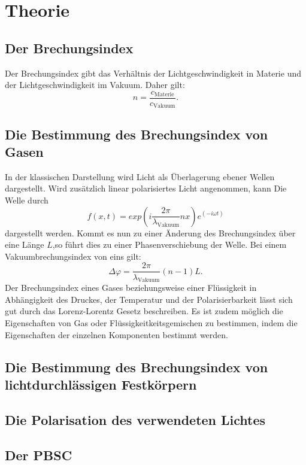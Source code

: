
\section{Theorie}
\label{sec:Theorie}
\subsection{Der Brechungsindex}
Der Brechungsindex gibt das Verhältnis der Lichtgeschwindigkeit in Materie und der Lichtgeschwindigkeit im Vakuum. Daher gilt:
\begin{equation}
    n = \frac{c_\text{Materie}}{c_\text{Vakuum}} \label{eqn:n} \text{.}
\end{equation}  
 \subsection{Die Bestimmung des Brechungsindex von Gasen}
 In der klassischen Darstellung wird Licht als Überlagerung ebener Wellen dargestellt. Wird zusätzlich linear polarisiertes Licht angenommen, kann Die Welle durch
 \begin{equation}
    f(x,t) = exp(i \frac{2 \pi}{\lambda_\text{Vakuum}} n x ) e^{(-i \omega t)} \label{eqn:ebeneWelle}
 \end{equation}
dargestellt werden. Kommt es nun zu einer Änderung des Brechungsindex über eine Länge $L$,so führt dies zu einer Phasenverschiebung der Welle. Bei einem Vakuumbrechungsindex von eins gilt:
\begin{equation}
    \Delta \varphi = \frac{2 \pi}{\lambda_\text{Vakuum}} (n-1) L \text{.} \label{eqn:Deltaphi}
\end{equation}
Der Brechungsindex eines Gases beziehungsweise einer Flüssigkeit in Abhängigkeit des Druckes, der Temperatur und der Polarisierbarkeit lässt sich gut durch das Lorenz-Lorentz Gesetz beschreiben. Es ist zudem möglich die Eigenschaften von Gas oder Flüssigkeitkeitsgemischen zu bestimmen, indem die Eigenschaften der einzelnen Komponenten bestimmt werden.


\subsection{Die Bestimmung des Brechungsindex von lichtdurchlässigen Festkörpern}


\subsection{Die Polarisation des verwendeten Lichtes}

\subsection{Der PBSC }